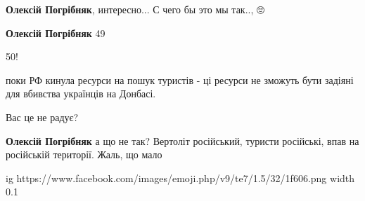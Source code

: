\begin{itemize}
 
\textbf{Олексій Погрібняк}, интересно... С чего бы это мы так.., 🙄🤔

 
\textbf{Олексій Погрібняк}
49🤣🤣🤣

 
50!

 

поки РФ кинула ресурси на пошук туристів - ці ресурси не зможуть бути задіяні
для вбивства українців на Донбасі.

Вас це не радує?


 
\textbf{Олексій Погрібняк} а що не так? Вертоліт російський, туристи російські, впав на російській території. Жаль, що мало


\ifcmt
  ig https://www.facebook.com/images/emoji.php/v9/te7/1.5/32/1f606.png
  width 0.1
\fi

 

\end{itemize}
